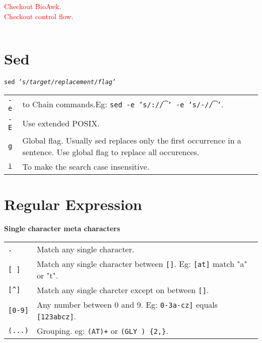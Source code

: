 \textcolor{red}{Checkout BioAwk}.\\
\textcolor{red}{Checkout control flow}.\\
\begin{tabularx}{\linewidth}{lX}
\hline
\end{tabularx}

\section{Sed}

\texttt{sed 's/\textit{target}/\textit{replacement}/\textit{flag}'}

\begin{tabularx}{\linewidth}{lX}
\texttt{-e} & to Chain commands.Eg: \texttt{sed -e 's/:/\t/' -e 's/-/\t/'}.\\
\texttt{-E} & Use extended POSIX.\\
\texttt{g} & Global flag. Usually sed replaces only the first occurrence  in a sentence. Use global flag to replace all occurences.\\
\texttt{i} & To make the search case insensitive.\\
\end{tabularx}



\section{Regular Expression}

\textbf{Single character meta characters}
\begin{tabularx}{\linewidth}{lX}

\texttt{.} & Match any single character.\\
\texttt{[ ]} & Match any single character between \texttt{[]}. Eg: \texttt{[at]} match "a" or "t".\\
\texttt{[\^{}]} & Match any single charcter except on between \texttt{[]}.\\
\texttt{[0-9]} & Any number between 0 and 9. Eg: \texttt{0-3a-cz]} equals \texttt{[123abcz]}.\\
\texttt{(...)} & Grouping. eg: \texttt{(AT)+} or \texttt{(GLY ) \{2,\}}.\\
\hline

\end{tabularx}


